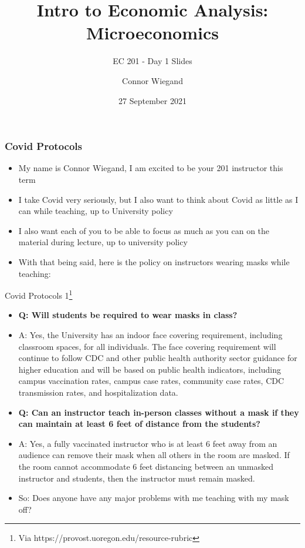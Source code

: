 \documentclass[10pt,xcolor={svgnames}]{beamer}
\title[Connor Wiegand]{Intro to Economic Analysis: Microeconomics}
\subtitle{EC 201 - Day 1 Slides}
\author[EC 201]{Connor Wiegand}
\institute[]{Department of Economics - University of Oregon}
\date{27 September 2021}
\begin{document}
\frame{\titlepage}


\begin{frame}
\frametitle{Covid Protocols}
\begin{itemize}
    \item<1-> My name is Connor Wiegand, I am excited to be your 201 instructor this term
    \item<2-> I take Covid very seriously, but I also want to think about Covid as little as I can while teaching, up to University policy
    \item<3-> I also want each of you to be able to focus as much as you can on the material during lecture, up to university policy
    \item<4-> With that being said, here is the policy on instructors wearing masks while teaching: 
    
    
\end{itemize}
\end{frame}


\begin{frame}{Covid Protocols 1\footnote{Via https://provost.uoregon.edu/resource-rubric}}
\begin{itemize}
\item<1-3> \textbf{Q: Will students be required to wear masks in class?}

\item<1-3> A: Yes, the University has an indoor face covering requirement, including classroom spaces, for all individuals. The face covering requirement will continue to follow CDC and other public health authority sector guidance for higher education and will be based on public health indicators, including campus vaccination rates, campus case rates, community case rates, CDC transmission rates, and hospitalization data.

\item<2->\textbf{ Q: Can an instructor teach in-person classes without a mask if they can maintain at least 6 feet of distance from the students?}

\item<2-> A: Yes, a fully vaccinated instructor who is at least 6 feet away from an audience can remove their mask when all others in the room are masked. If the room cannot accommodate 6 feet distancing between an unmasked instructor and students, then the instructor must remain masked.

\item<3-> So: Does anyone have any major problems with me teaching with my mask off?

\end{itemize}
\end{frame}
\end{document}
